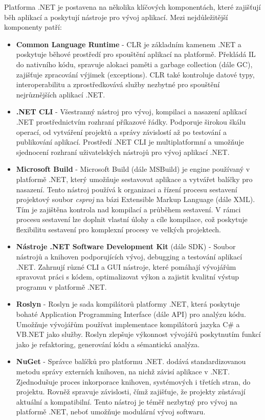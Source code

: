 

Platforma .NET je postavena na několika klíčových komponentách, které zajišťují běh aplikací a poskytují nástroje pro vývoj aplikací. Mezi nejdůležitější komponenty patří:

\begin{itemize}
    \item \textbf{Common Language Runtime} - CLR je základním kamenem .NET a poskytuje běhové prostředí pro spouštění aplikací na platformě. Překládá IL do nativního kódu, spravuje alokaci paměti a garbage collection (dále GC), zajišťuje zpracování výjimek (exceptions). CLR také kontroluje datové typy, interoperabilitu a zprostředkovává služby nezbytné pro spouštění nejrůznějších aplikací .NET. \cite{Richter2012}
    \item \textbf{.NET CLI} - Všestranný nástroj pro vývoj, kompilaci a nasazení aplikací .NET prostřednictvím rozhraní příkazové řádky. Podporuje širokou škálu operací, od vytváření projektů a správy závislostí až po testování a publikování aplikací. \cite{netdocscli} Prostředí .NET CLI je multiplatformní a umožňuje sjednocení rozhraní uživatelských nástrojů pro vývoj aplikací .NET. 
    \item \textbf{Microsoft Build} - Microsoft Build (dále MSBuild) je engine používaný v platformě .NET, který umožňuje sestavovat aplikace a vytvářet balíčky pro nasazení. \cite{netdocsmsbuild} Tento nástroj používá k organizaci a řízení procesu sestavení projektový soubor \emph{csproj} na bázi Extensible Markup Language (dále XML). Tím je zajištěna kontrola nad kompilací a průběhem sestavení. V rámci procesu sestavení lze doplnit vlastní úlohy a cíle kompilace, což poskytuje flexibilitu sestavení pro komplexní procesy ve velkých projektech.
    \item \textbf{Nástroje .NET Software Development Kit} (dále SDK) - Soubor nástrojů a knihoven podporujících vývoj, debugging a testování aplikací .NET. Zahrnují různé CLI a GUI nástroje, které pomáhají vývojářům spravovat práci s kódem, optimalizovat výkon a zajistit kvalitní výstup programu v platformě .NET. \cite{Price2023c8}
    \item \textbf{Roslyn} - Roslyn je sada kompilátorů platformy .NET, která poskytuje bohaté Application Programming Interface (dále API) pro analýzu kódu. \cite{Harrison2017} Umožňuje vývojářům používat implementace kompilátorů jazyka C\# a VB.NET jako služby. Roslyn zlepšuje výkonnost vývojářů poskytnutím funkcí jako je refaktoring, generování kódu a sémantická analýza.
    \item \textbf{NuGet} - Správce balíčků pro platformu .NET. dodává standardizovanou metodu správy externích knihoven, na nichž závisí aplikace v .NET. \cite{Williams2023} Zjednodušuje proces inkorporace knihoven, systémových i třetích stran, do projektu. Rovněž spravuje závislosti, čímž zajišťuje, že projekty zůstávají aktuální a kompatibilní. Tento nástroj je téměř nezbytný pro vývoj na platformě .NET, neboť umožňuje modulární vývoj softwaru. 
\end{itemize}

